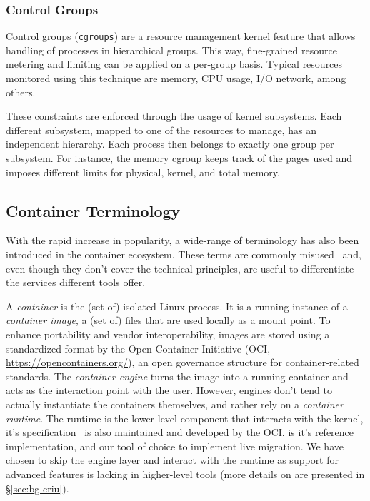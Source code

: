 \subsubsection*{Control Groups}

Control groups (\texttt{cgroups}) are a resource management kernel feature that allows handling of processes in hierarchical groups.
This way, fine-grained resource metering and limiting can be applied on a per-group basis.
Typical resources monitored using this technique are memory, CPU usage, I/O network, among others.

These constraints are enforced through the usage of kernel subsystems.
Each different subsystem, mapped to one of the resources to manage, has an independent hierarchy.
Each process then belongs to exactly one group per subsystem.
For instance, the memory cgroup keeps track of the pages used and imposes different limits for physical, kernel, and total memory.

\subsection*{Container Terminology}

With the rapid increase in popularity, a wide-range of terminology has also been introduced in the container ecosystem.
These terms are commonly misused~\cite{McCarty2018} and, even though they don't cover the technical principles, are useful to differentiate the services different tools offer.

A \emph{container} is the (set of) isolated Linux process.
It is a running instance of a \emph{container image}, a (set of) files that are used locally as a mount point.
To enhance portability and vendor interoperability, images are stored using a standardized format by the Open Container Initiative (OCI, \url{https://opencontainers.org/}), an open governance structure for container-related standards.
The \emph{container engine} turns the image into a running container and acts as the interaction point with the user.
However, engines don't tend to actually instantiate the containers themselves, and rather rely on a \textit{container runtime}.
The runtime is the lower level component that interacts with the kernel, it's specification~\cite{container-runtime-specification} is also maintained and developed by the OCI.
\runc is it's reference implementation, and our tool of choice to implement live migration.
We have chosen to skip the engine layer and interact with the runtime as support for advanced \criu features is lacking in higher-level tools (more details on \criu are presented in \S\ref{sec:bg-criu}).

